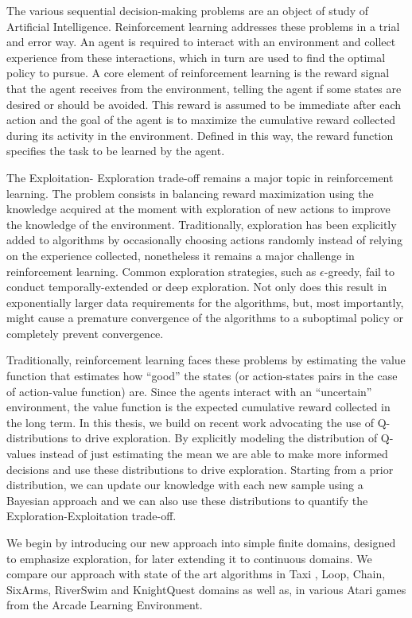\par
The various sequential decision-making problems are an object of study of Artificial Intelligence. Reinforcement learning addresses these problems in a trial and error way.  An agent is required to interact with an environment and collect experience from these interactions, which in turn are used to find the optimal policy to pursue. A core element of reinforcement learning is the reward signal that the agent receives from the environment, telling the agent if some states are desired or should be avoided. This reward is assumed to be immediate after each action and the goal of the agent is to maximize the cumulative reward collected during its activity in the environment. Defined in this way, the reward function specifies the task to be learned by the agent.\par
The Exploitation- Exploration trade-off remains a major topic in reinforcement learning. The problem consists in balancing reward maximization using the knowledge acquired at the moment with exploration of new actions to improve the knowledge of the environment. Traditionally, exploration has been explicitly added to algorithms by occasionally choosing actions randomly instead of relying on the experience collected, nonetheless it remains a major challenge in reinforcement learning. Common exploration strategies, such as $\epsilon$-greedy, fail to conduct temporally-extended or deep exploration. Not only does this result in exponentially larger data requirements for the algorithms, but, most importantly, might cause a premature convergence of the algorithms to a suboptimal policy or completely prevent convergence.\par
Traditionally, reinforcement learning faces these problems by estimating the value function that estimates how ``good'' the states (or action-states pairs in the case of action-value function) are. Since the agents interact with an ``uncertain'' environment, the value function is the expected cumulative reward collected in the long term. In this thesis, we build on recent work advocating the use of Q-distributions to drive exploration. By explicitly modeling the distribution of Q-values instead of just estimating the mean we are able to make more informed decisions and use these distributions to drive exploration. Starting from a prior distribution, we can update our knowledge with each new sample using a Bayesian approach and we can also use these distributions to quantify the Exploration-Exploitation trade-off.\par
We begin by introducing our new approach into simple finite domains, designed to emphasize exploration, for later extending it to continuous domains.   We compare our approach with state of the art algorithms in Taxi , Loop, Chain, SixArms, RiverSwim and KnightQuest domains as well as, in various Atari games from the Arcade Learning Environment.